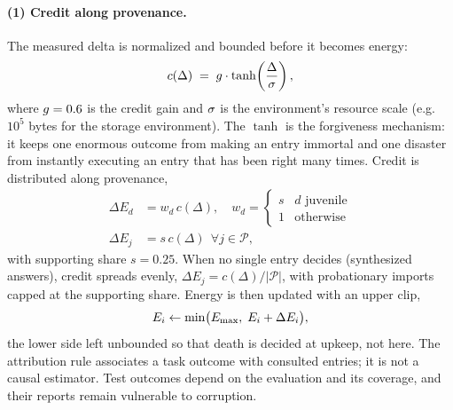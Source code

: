 \paragraph{(1) Credit along provenance.}
The measured delta is normalized and bounded before it becomes energy:
\begin{equation}
  c(\Delta) \;=\; g \cdot \tanh\!\left(\frac{\Delta}{\sigma}\right),
  \label{eq:credit}
\end{equation}
where $g = 0.6$ is the credit gain and $\sigma$ is the
environment's resource scale (e.g.\ $10^5$ bytes for the storage
environment). The $\tanh$ is the forgiveness mechanism: it keeps one
enormous outcome from making an entry immortal and one disaster from
instantly executing an entry that has been right many times. Credit is
distributed along provenance,
\begin{equation}
  \begin{aligned}
    \Delta E_d &= w_d\, c(\Delta), \quad
      w_d = \begin{cases} s & d \text{ juvenile}\\
                           1 & \text{otherwise}\end{cases}\\[2pt]
    \Delta E_j &= s\, c(\Delta)\ \ \forall j \in \mathcal{P},
  \end{aligned}
  \label{eq:provenance}
\end{equation}
with supporting share $s = 0.25$. When no single entry decides
(synthesized answers), credit spreads evenly, $\Delta E_j = c(\Delta)/|\mathcal{P}|$,
with probationary imports capped at the supporting share. Energy is then
updated with an upper clip,
\begin{equation}
  E_i \leftarrow \min\!\big(E_{\max},\; E_i + \Delta E_i\big),
  \label{eq:apply}
\end{equation}
the lower side left unbounded so that death is decided at upkeep, not
here. The attribution rule associates a task outcome with consulted entries;
it is not a causal estimator. Test outcomes depend on the evaluation
and its coverage, and their reports remain vulnerable to corruption.

